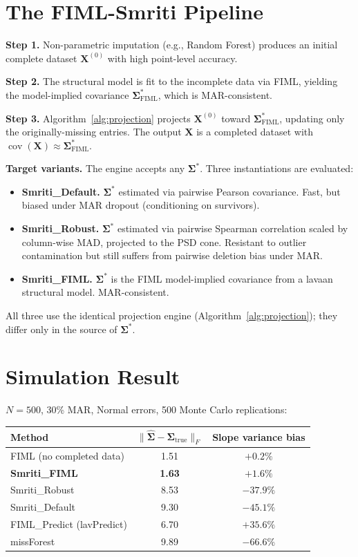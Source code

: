 \documentclass[11pt]{article}
\begin{document}
\section{The FIML-Smriti Pipeline}

\textbf{Step 1.} Non-parametric imputation (e.g., Random Forest) produces an initial complete dataset $\bm{X}^{(0)}$ with high point-level accuracy.

\textbf{Step 2.} The structural model is fit to the incomplete data via FIML, yielding the model-implied covariance $\bm{\Sigma}^*_{\text{FIML}}$, which is MAR-consistent.

\textbf{Step 3.} Algorithm~\ref{alg:projection} projects $\bm{X}^{(0)}$ toward $\bm{\Sigma}^*_{\text{FIML}}$, updating only the originally-missing entries. The output $\bm{X}$ is a completed dataset with $\operatorname{cov}(\bm{X}) \approx \bm{\Sigma}^*_{\text{FIML}}$.

\textbf{Target variants.} The engine accepts any $\bm{\Sigma}^*$. Three instantiations are evaluated:

\begin{itemize}
    \item \textbf{Smriti\_Default.} $\bm{\Sigma}^*$ estimated via pairwise Pearson covariance. Fast, but biased under MAR dropout (conditioning on survivors).
    \item \textbf{Smriti\_Robust.} $\bm{\Sigma}^*$ estimated via pairwise Spearman correlation scaled by column-wise MAD, projected to the PSD cone. Resistant to outlier contamination but still suffers from pairwise deletion bias under MAR.
    \item \textbf{Smriti\_FIML.} $\bm{\Sigma}^*$ is the FIML model-implied covariance from a lavaan structural model. MAR-consistent.
\end{itemize}

All three use the identical projection engine (Algorithm~\ref{alg:projection}); they differ only in the source of $\bm{\Sigma}^*$.

\section{Simulation Result}

$N=500$, 30\% MAR, Normal errors, 500 Monte Carlo replications:

\begin{table}[ht]
\centering
\begin{tabular}{lcc}
\toprule
Method & $\|\hat{\bm{\Sigma}} - \bm{\Sigma}_{\text{true}}\|_F$ & Slope variance bias \\
\midrule
FIML (no completed data) & 1.51 & $+0.2\%$ \\
\textbf{Smriti\_FIML} & \textbf{1.63} & \textbf{$+1.6\%$} \\
Smriti\_Robust & 8.53 & $-37.9\%$ \\
Smriti\_Default & 9.30 & $-45.1\%$ \\
FIML\_Predict (lavPredict) & 6.70 & $+35.6\%$ \\
missForest & 9.89 & $-66.6\%$ \\
\bottomrule
\end{tabular}
\end{table}
\end{document}

